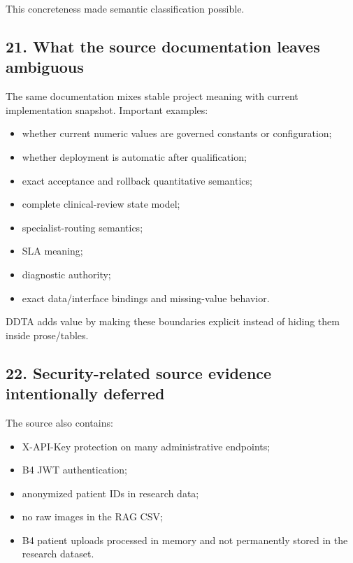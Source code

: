 \documentclass[11pt,a4paper]{article}
\providecommand{\tightlist}{\setlength{\itemsep}{0pt}\setlength{\parskip}{0pt}}
\begin{document}
This concreteness made semantic classification possible.

\subsection{21. What the source documentation leaves
ambiguous}\label{21-what-the-source-documentation-leaves-ambiguous}

The same documentation mixes stable project meaning with current
implementation snapshot. Important examples:

\begin{itemize}
\tightlist
\item
  whether current numeric values are governed constants or
  configuration;
\item
  whether deployment is automatic after qualification;
\item
  exact acceptance and rollback quantitative semantics;
\item
  complete clinical-review state model;
\item
  specialist-routing semantics;
\item
  SLA meaning;
\item
  diagnostic authority;
\item
  exact data/interface bindings and missing-value behavior.
\end{itemize}

DDTA adds value by making these boundaries explicit instead of hiding
them inside prose/tables.

\subsection{22. Security-related source evidence intentionally
deferred}\label{22-security-related-source-evidence-intentionally-deferred}

The source also contains:

\begin{itemize}
\tightlist
\item
  X-API-Key protection on many administrative endpoints;
\item
  B4 JWT authentication;
\item
  anonymized patient IDs in research data;
\item
  no raw images in the RAG CSV;
\item
  B4 patient uploads processed in memory and not permanently stored in
  the research dataset.
\end{itemize}
\end{document}
